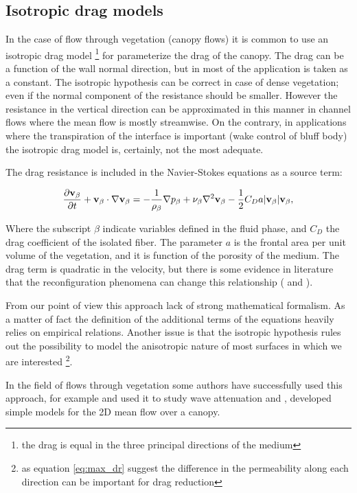 \subsection{Isotropic drag models}
\label{sec:canopy_eq}

In the case of flow through vegetation (canopy flows) it is common to use an isotropic drag model \footnote{the drag is equal in the three principal directions of the medium } for parameterize the drag of the canopy.
The drag can be a function of the wall normal direction, but in most of the application is taken as a constant.
The isotropic hypothesis can be correct in case of dense vegetation; even if the normal component of the resistance should be smaller.
However the resistance in the vertical direction can be approximated in this manner in channel flows where the mean flow is mostly streamwise. On the contrary, in applications where the transpiration of the interface is important (wake control of bluff body) the isotropic drag model is, certainly, not the most adequate.

The drag resistance is included in the Navier-Stokes equations as a source term:

\begin{equation}
\dfrac{\partial \textbf{v}_{\beta}}{\partial t} + \textbf{v}_{\beta} \cdot \nabla \textbf{v}_{\beta} = -\frac{1}{\rho_{\beta}} \nabla p_{\beta} + \nu_{\beta} \nabla^2 \textbf{v}_{\beta} - \dfrac{1}{2} C_D a |\textbf{v}_{\beta}| \textbf{v}_{\beta}, 
\label{eq:mom_cd}
\end{equation}

Where the subscript $\beta$ indicate variables defined in the fluid phase, and $C_D$ the drag coefficient of the isolated fiber.
The parameter $a$ is the frontal area per unit volume of the vegetation, and it is function of the porosity of the medium.
The drag term is quadratic in the velocity, but there is some evidence in literature that the reconfiguration phenomena can change this relationship (\citet{gosselin2011drag} and \citet{alvarado2017nature}).

From our point of view this approach lack of strong mathematical formalism. As a matter of fact the definition of the additional terms of the equations heavily relies on empirical relations.
Another issue is that the isotropic hypothesis rules out the possibility to model the anisotropic nature of most surfaces in which we are interested \footnote{as equation \eqref{eq:max_dr} suggest the difference in the permeability along each direction can be important for drag reduction}.

In the field of flows through vegetation some authors have successfully used this approach, for example \citet{maza2013coupled} and \citet{maza2015tsunami} used it to study wave attenuation and \citet{ghisalberti2004limited}, \citet{battiato2014single} developed simple models for the 2D mean flow over a canopy.


